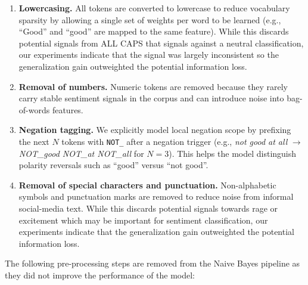\documentclass[11pt]{article}
\begin{document}
\begin{enumerate}
    \item \textbf{Lowercasing.} All tokens are converted to lowercase to reduce vocabulary sparsity by allowing a single set of weights per word to be learned (e.g., ``Good'' and ``good'' are mapped to the same feature). While this discards potential signals from ALL CAPS that signals against a neutral classification, our experiments indicate that the signal was largely inconsistent so the generalization gain outweighted the potential information loss. 
    \item \textbf{Removal of numbers.} Numeric tokens are removed because they rarely carry stable sentiment signals in the corpus and can introduce noise into bag-of-words features.
    \item \textbf{Negation tagging.} We explicitly model local negation scope by prefixing the next $N$ tokens with \texttt{NOT\_} after a negation trigger (e.g., \textit{not good at all} $\rightarrow$ \textit{NOT\_good NOT\_at NOT\_all} for $N{=}3$). This helps the model distinguish polarity reversals such as ``good'' versus ``not good''.
    \item \textbf{Removal of special characters and punctuation.} Non-alphabetic symbols and punctuation marks are removed to reduce noise from informal social-media text. While this discards potential signals towards rage or excitement which may be important for sentiment classification, our experiments indicate that the generalization gain outweighted the potential information loss. 
\end{enumerate}

The following pre-processing steps are removed from the Naive Bayes pipeline as they did not improve the performance of the model:
\end{document}
